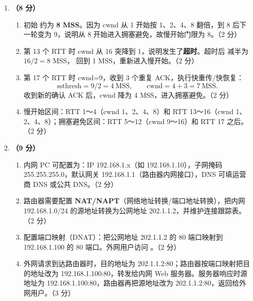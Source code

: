 \documentclass[a4paper,11pt]{article}
\begin{document}
\begin{enumerate}[start=13, label=\textbf{\arabic*.}, leftmargin=2.4em, itemsep=0.45em]
\item \textbf{（8 分）}
\begin{enumerate}[label=（\arabic*）, leftmargin=2.2em, itemsep=1pt]
  \item 初始  约为 \textbf{8 MSS}。因为 cwnd 从 1 开始按 1、2、4、8 翻倍，到 8 后下一轮变为 9，说明从 8 开始进入拥塞避免，故慢开始门限为 8。\hfill（2 分）
  \item 第 13 个 RTT 时 cwnd 从 16 突降到 1，说明发生了\textbf{超时}。超时后  减半为 $16/2=8$ MSS， 回到 1 MSS，重新进入慢开始。\hfill（2 分）
  \item 第 17 个 RTT 时 cwnd=9，收到 3 个重复 ACK，执行快重传/快恢复：
  \[
  \text{ssthresh}=9/2=4\ \text{MSS},\qquad \text{cwnd}=4+3=7\ \text{MSS}.
  \]
  收到新的确认 ACK 后，cwnd 降为 4 MSS，进入拥塞避免。\hfill（2 分）
  \item 慢开始区间：RTT 1～4（cwnd 1、2、4、8）和 RTT 13～16（cwnd 1、2、4、8）；拥塞避免区间：RTT 5～12（cwnd 9～16）和 RTT 17 之后。\hfill（2 分）
\end{enumerate}

\item \textbf{（9 分）}
\begin{enumerate}[label=（\arabic*）, leftmargin=2.2em, itemsep=1pt]
  \item 内网 PC 可配置为：IP 192.168.1.x（如 192.168.1.10），子网掩码 255.255.255.0，默认网关 192.168.1.1（路由器内网接口），DNS 可填运营商 DNS 或公共 DNS。\hfill（2 分）
  \item 路由器需要配置 \textbf{NAT/NAPT}（网络地址转换/端口地址转换），把内网 192.168.1.0/24 的源地址转换为公网地址 202.1.1.2，并维护连接跟踪表。\hfill（2 分）
  \item 配置端口映射（DNAT）：把公网地址 202.1.1.2 的 80 端口映射到 192.168.1.100 的 80 端口。外网用户访问 。\hfill（2 分）
  \item 外网请求到达路由器时，目的地址为 202.1.1.2:80；路由器按端口映射把目的地址改为 192.168.1.100:80，转发给内网 Web 服务器。服务器响应时源地址为 192.168.1.100:80，路由器再把源地址改为 202.1.1.2:80，返回给外网用户。\hfill（3 分）
\end{enumerate}

\end{enumerate}

\end{document}
